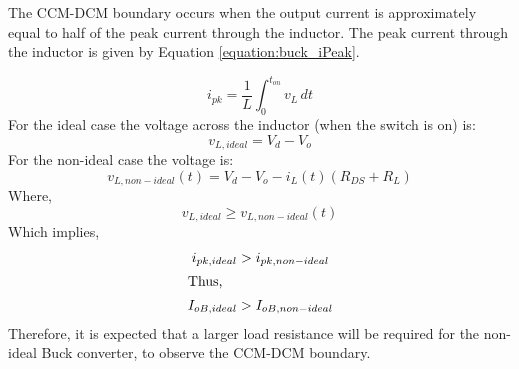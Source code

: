 \documentclass[12pt,twoside]{scrartcl}
\begin{document}
\vspace{5mm}
\noindent The CCM-DCM boundary occurs when the output current is approximately equal to half of the peak current through the inductor. The peak current through the inductor is given by Equation \ref{equation:buck_iPeak}.\par
\begin{equation}
i_{pk} = \frac{1}{L}\int_{0}^{t_{on}}v_{L} \,dt \label{equation:buck_iPeak}
\end{equation}
\noindent For the ideal case the voltage across the inductor (when the switch is on) is:
\begin{equation*}
v_{L,ideal} = V_{d} - V_{o}
\end{equation*}
For the non-ideal case the voltage is:
\begin{equation*}
v_{L,non-ideal}(t) = V_{d} - V_{o} - i_{L}(t)(R_{DS} + R_{L})
\end{equation*}
Where,
\begin{equation*}
v_{L,ideal} \ge v_{L,non-ideal}(t)
\end{equation*}
Which implies,
\begin{align*}
i_{pk,ideal} &> i_{pk,non-ideal} \\
\intertext{Thus,}
 I_{oB,ideal} &> I_{oB,non-ideal}
\end{align*}
Therefore, it is expected that a larger load resistance will be required for the non-ideal Buck converter, to observe the CCM-DCM boundary.\par

\newpage
\end{document}
